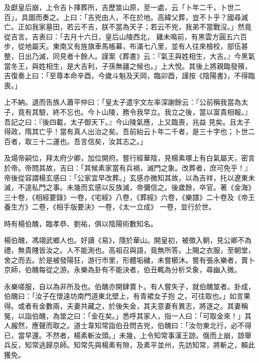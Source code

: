 \begin{pinyinscope}
 及獻皇后崩，上令吉卜擇葬所，吉歷筮山原，至一處，云「卜年二千，卜世二百」，具圖而奏之。上曰：「吉兇由人，不在於地。高緯父葬，豈不卜乎？國尋滅亡。正如我家墓田，若云不吉，朕不當為天子；若云不兇，我弟不當戰沒。」然竟從吉言。吉表曰：「去月十六日，皇后山陵西北，
 雞未鳴前，有黑雲方圓五六百步，從地屬天。東南又有旌旗車馬帳幕，布滿七八里，並有人往來檢校，部伍甚整，日出乃滅，同見者十餘人。謹案《葬書》云：『氣王與姓相生，大吉。』今黑氣當冬王，與姓相生，是大吉利，子孫無疆之候也。」上大悅。其後上將親臨發殯，吉復奏上曰：「至尊本命辛酉，今歲斗魁及天岡，臨卯酉，謹按《陰陽書》，不得臨喪。」



 上不納。退而告族人蕭平仲曰：「皇太子遣宇文左率深謝餘云：『公前稱我當為太子，竟有其驗，終不忘也。今卜山陵，務令我早立。我立之後，當以富貴相報。』吾記之曰：『後四載，太子御天下。』今山陵氣應，上又臨喪，兆益
 見矣。且太子得政，隋其亡乎！當有真人出治之矣。吾前紿云卜年二千者，是三十字也；卜世二百者，取三十二運也。吾言信矣，汝其志之。」



 及煬帝嗣位，拜太府少卿，加位開府。嘗行經華陰，見楊素塚上有白氣屬天，密言於帝。帝問其故，吉曰：「其候素家當有兵禍，滅門之象。改葬者，庶可免乎！』帝後從容謂楊玄感曰：「公家宜早改葬。」玄感亦微知其故，以為吉祥，托以遼東未滅，不遑私門之事。未幾而玄感以反族滅，帝彌信之。後歲餘，卒官。著《金海》三十卷，《相經要錄》一卷，《宅經》八卷，《葬經》六卷，《樂譜》二十卷及《帝王養生方》二卷，《相手版要決》一卷，《太一立成》
 一卷，並行於世。



 時有楊伯醜，臨孝恭、劉祐，俱以陰陽術數知名。



 楊伯醜，馮翊武鄉人也。好讀《易》，隱於華山。開皇初，被徵入朝，見公卿不為禮，無貴賤皆汝之。人不能測也。高祖召與語，竟無所答。上賜之衣服，至朝堂，舍之而去。於是被發陽狂，游行市里，形體垢穢，未嘗櫛沐。嘗有張永樂者，賣卜京師，伯醜每從之游。永樂為卦有不能決者，伯丑輒為分析爻象，尋幽入微。



 永樂嗟服，自以為非所及也。伯醜亦開肆賣卜。有人嘗失子，就伯醜筮者。卦成，伯醜曰：「汝子在懷遠坊南門道東北壁上，有青裙女子抱
 之，可往取也。」如言果得。或者有金數兩，夫妻共藏之，於後失金，其夫意妻有異志，將逐之。其妻稱冤，以詣伯醜，為筮之曰：「金在矣。」悉呼其家人，指一人曰：「可取金來！」其人赧然，應聲而取之。道士韋知常詣伯丑問吉兇，伯醜曰：「汝勿東北行，必不得已，當早還。不然者，楊素斬汝頭。」未幾，上令知常事漢王諒。俄而上崩，諒舉兵反，知常逃歸京師。知常先與楊素有隙，及素平並州，先訪知常，將斬之，賴此獲免。




\end{pinyinscope}
